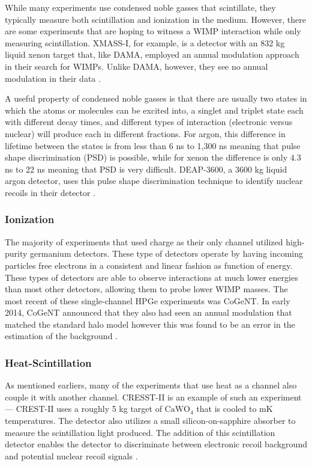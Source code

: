 While many experiments use condensed noble gasses that scintillate, they typically measure both scintillation and ionization in the medium.  However, there are some experiments that are hoping to witness a WIMP interaction while only measuring scintillation.  XMASS-I, for example, is a detector with an 832 kg liquid xenon target that, like DAMA, employed an annual modulation approach in their search for WIMPs.  Unlike DAMA, however, they see no annual modulation in their data \cite{xmass2016direct}.  

A useful property of condensed noble gasses is that there are usually two states in which the atoms or molecules can be excited into, a singlet and triplet state each with different decay times, and different types of interaction (electronic versus nuclear) will produce each in different fractions.  For argon, this difference in lifetime between the states is from less than 6 ns to 1,300 ns \cite{heindl2011table} meaning that pulse shape discrimination (PSD) is possible, while for xenon the difference is only 4.3 ns to 22 ns meaning that PSD is very difficult.  DEAP-3600, a 3600 kg liquid argon detector, uses this pulse shape discrimination technique to identify nuclear recoils in their detector \cite{amaudruz2017first}.     


\subsubsection{Ionization}

The majority of experiments that used charge as their only channel utilized high-purity germanium detectors.  These type of detectors operate by having incoming particles free electrons in a consistent and linear fashion as function of energy.  These types of detectors are able to observe interactions at much lower energies than most other detectors, allowing them to probe lower WIMP masses.  The most recent of these single-channel HPGe experiments was CoGeNT.  In early 2014, CoGeNT announced that they also had seen an annual modulation that matched the standard halo model \cite{aalseth2014search} however this was found to be an error in the estimation of the background \cite{aalseth2014maximum}.


\subsubsection{Heat-Scintillation}

As mentioned earliers, many of the experiments that use heat as a channel also couple it with another channel.  CRESST-II is an example of such an experiment --- CREST-II uses a roughly 5 kg target of $\textrm{CaWO}_4$ that is cooled to mK temperatures.  The detector also utilizes a small silicon-on-sapphire absorber to measure the scintillation light produced.  The addition of this scintillation detector enables the detector to discriminate between electronic recoil background and potential nuclear recoil signals \cite{strauss2016exploring}.  


